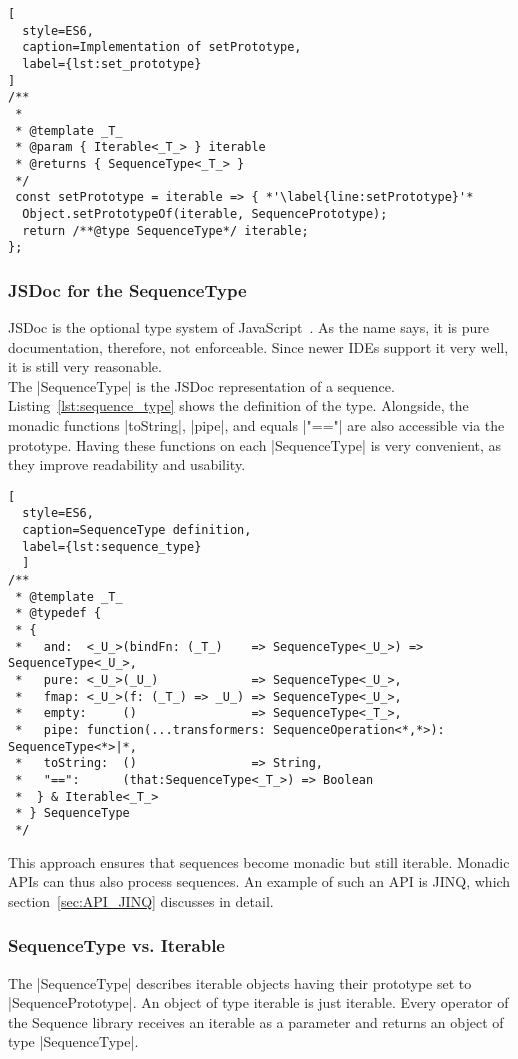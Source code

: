\begin{lstlisting}[
  style=ES6,
  caption=Implementation of setPrototype,
  label={lst:set_prototype}
]
/**
 *
 * @template _T_
 * @param { Iterable<_T_> } iterable
 * @returns { SequenceType<_T_> }
 */
 const setPrototype = iterable => { *'\label{line:setPrototype}'*
  Object.setPrototypeOf(iterable, SequencePrototype);
  return /**@type SequenceType*/ iterable;
};
\end{lstlisting}

\subsubsection{JSDoc for the SequenceType} %
\label{subsub:The SequenceType}
JSDoc is the optional type system of JavaScript~\cite{jsdoc_use_2023}. As the
name says, it is pure documentation, therefore, not enforceable. Since newer
IDEs support it very well, it is still very reasonable.\\
The |SequenceType| is the JSDoc representation of a sequence.
Listing~\ref{lst:sequence_type} shows the definition of the type. Alongside, the
monadic functions |toString|, |pipe|, and equals |"=="| are also
accessible via the prototype. Having these functions on each |SequenceType| is
very convenient, as they improve readability and usability.

\begin{lstlisting}[
  style=ES6, 
  caption=SequenceType definition,
  label={lst:sequence_type}
  ]
/**
 * @template _T_
 * @typedef {
 * {
 *   and:  <_U_>(bindFn: (_T_)    => SequenceType<_U_>) => SequenceType<_U_>,
 *   pure: <_U_>(_U_)             => SequenceType<_U_>,
 *   fmap: <_U_>(f: (_T_) => _U_) => SequenceType<_U_>,
 *   empty:     ()                => SequenceType<_T_>,
 *   pipe: function(...transformers: SequenceOperation<*,*>): SequenceType<*>|*,
 *   toString:  ()                => String,
 *   "==":      (that:SequenceType<_T_>) => Boolean
 *  } & Iterable<_T_>
 * } SequenceType
 */
\end{lstlisting}

This approach ensures that sequences become monadic but still iterable.
Monadic APIs can thus also process sequences. An example of such an API is
JINQ, which section~\ref{sec:API_JINQ} discusses in detail.

\subsubsection{SequenceType vs. Iterable} %
\label{subsub:SequenceType vs. Iterable}
The |SequenceType| describes iterable objects having their
prototype set to |SequencePrototype|. An object of type iterable is just
iterable.
Every operator of the Sequence library receives an iterable as a parameter and
returns an object of type |SequenceType|.

